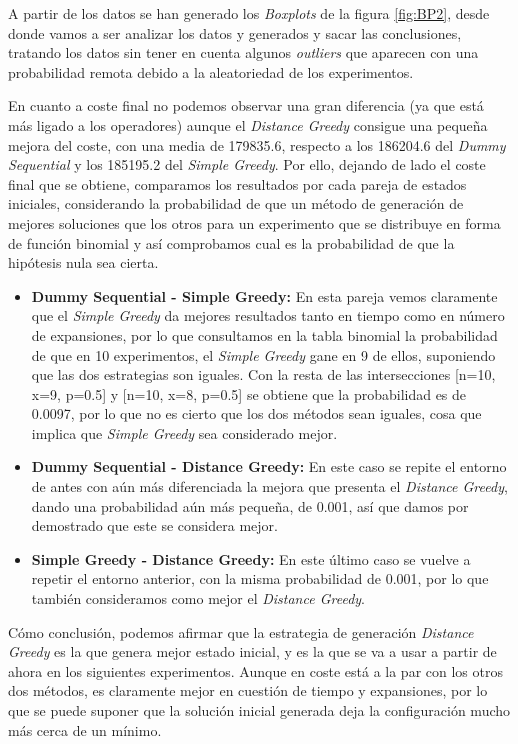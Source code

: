 \documentclass{article}
\begin{document}
\begin{enumerate}
  A partir de los datos se han generado los \textit{Boxplots} de la figura \ref{fig:BP2}, desde donde vamos a ser analizar los datos y generados y sacar las conclusiones, tratando los datos sin tener en cuenta algunos \textit{outliers} que aparecen con una probabilidad remota debido a la aleatoriedad de los experimentos.\par
  En cuanto a coste final no podemos observar una gran diferencia (ya que está más ligado a los operadores) aunque el \textit{Distance Greedy} consigue una pequeña mejora del coste, con una media de 179835.6, respecto a los 186204.6 del \textit{Dummy Sequential} y los 185195.2 del \textit{Simple Greedy}. Por ello, dejando de lado el coste final que se obtiene, comparamos los resultados por cada pareja de estados iniciales, considerando la probabilidad de que un método de generación de mejores soluciones que los otros para un experimento que se distribuye en forma de función binomial y así comprobamos cual es la probabilidad de que la hipótesis nula sea cierta.

  \begin{itemize}
    \item \textbf{Dummy Sequential - Simple Greedy:} En esta pareja vemos claramente que el \textit{Simple Greedy} da mejores resultados tanto en tiempo como en número de expansiones, por lo que consultamos en la tabla binomial la probabilidad de que en 10 experimentos, el \textit{Simple Greedy} gane en 9 de ellos, suponiendo que las dos estrategias son iguales. Con la resta de las intersecciones [n=10, x=9, p=0.5] y [n=10, x=8, p=0.5] se obtiene que la probabilidad es de 0.0097, por lo que no es cierto que los dos métodos sean iguales, cosa que implica que \textit{Simple Greedy} sea considerado mejor.
    \item \textbf{Dummy Sequential - Distance Greedy:} En este caso se repite el entorno de antes con aún más diferenciada la mejora que presenta el \textit{Distance Greedy}, dando una probabilidad aún más pequeña, de 0.001, así que damos por demostrado que este se considera mejor.
    \item \textbf{Simple Greedy - Distance Greedy:} En este último caso se vuelve a repetir el entorno anterior, con la misma probabilidad de 0.001, por lo que también consideramos como mejor el \textit{Distance Greedy}.
  \end{itemize}

  Cómo conclusión, podemos afirmar que la estrategia de generación \textit{Distance Greedy} es la que genera mejor estado inicial, y es la que se va a usar a partir de ahora en los siguientes experimentos. Aunque en coste está a la par con los otros dos métodos, es claramente mejor en cuestión de tiempo y expansiones, por lo que se puede suponer que la solución inicial generada deja la configuración mucho más cerca de un mínimo.


\end{enumerate}
\end{document}
